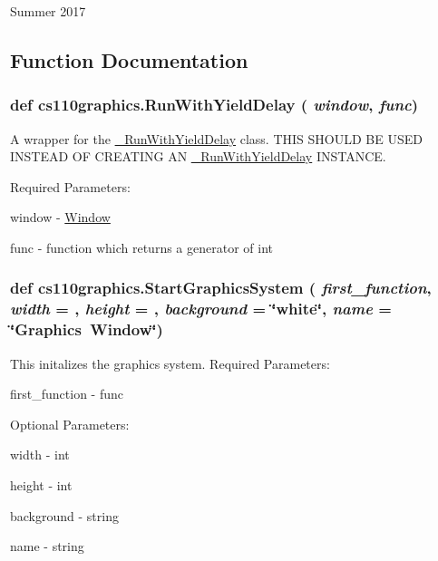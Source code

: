 Summer 2017 

\subsection{Function Documentation}
\hypertarget{namespacecs110graphics_a0715c42bb0e296007b96bd0a20903d16}{
\subsubsection[{RunWithYieldDelay}]{\setlength{\rightskip}{0pt plus 5cm}def cs110graphics.RunWithYieldDelay ( {\em window}, \/   {\em func})}}
\label{namespacecs110graphics_a0715c42bb0e296007b96bd0a20903d16}


A wrapper for the \hyperlink{classcs110graphics_1_1__RunWithYieldDelay}{\_\-RunWithYieldDelay} class. THIS SHOULD BE USED INSTEAD OF CREATING AN \hyperlink{classcs110graphics_1_1__RunWithYieldDelay}{\_\-RunWithYieldDelay} INSTANCE.

Required Parameters:
\begin{DoxyItemize}
\item window -\/ \hyperlink{classcs110graphics_1_1Window}{Window}
\item func -\/ function which returns a generator of int 
\end{DoxyItemize}\hypertarget{namespacecs110graphics_af1a7cabc9d0dea87259e97ad88ef85ac}{
\subsubsection[{StartGraphicsSystem}]{\setlength{\rightskip}{0pt plus 5cm}def cs110graphics.StartGraphicsSystem ( {\em first\_\-function}, \/   {\em width} = {}, \/   {\em height} = {}, \/   {\em background} = {\ttfamily \char`\"{}white\char`\"{}}, \/   {\em name} = {\ttfamily \char`\"{}Graphics~Window\char`\"{}})}}
\label{namespacecs110graphics_af1a7cabc9d0dea87259e97ad88ef85ac}


This initalizes the graphics system. Required Parameters:
\begin{DoxyItemize}
\item first\_\-function -\/ func
\end{DoxyItemize}

Optional Parameters:
\begin{DoxyItemize}
\item width -\/ int
\item height -\/ int
\item background -\/ string
\item name -\/ string 
\end{DoxyItemize}
